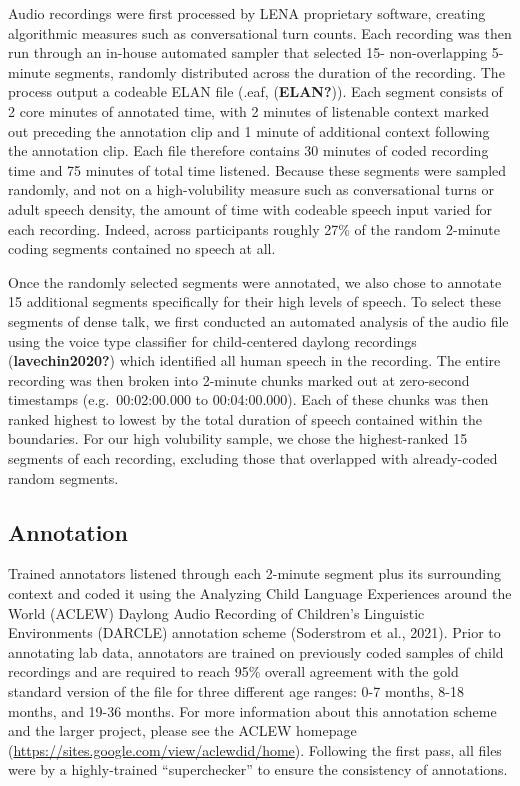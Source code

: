 \documentclass[
  man,floatsintext]{apa6}
\begin{document}
Audio recordings were first processed by LENA proprietary software, creating algorithmic measures such as conversational turn counts. Each recording was then run through an in-house automated sampler that selected 15- non-overlapping 5-minute segments, randomly distributed across the duration of the recording. The process output a codeable ELAN file (.eaf, (\textbf{ELAN?})). Each segment consists of 2 core minutes of annotated time, with 2 minutes of listenable context marked out preceding the annotation clip and 1 minute of additional context following the annotation clip. Each file therefore contains 30 minutes of coded recording time and 75 minutes of total time listened. Because these segments were sampled randomly, and not on a high-volubility measure such as conversational turns or adult speech density, the amount of time with codeable speech input varied for each recording. Indeed, across participants roughly 27\% of the random 2-minute coding segments contained no speech at all.

Once the randomly selected segments were annotated, we also chose to annotate 15 additional segments specifically for their high levels of speech. To select these segments of dense talk, we first conducted an automated analysis of the audio file using the voice type classifier for child-centered daylong recordings (\textbf{lavechin2020?}) which identified all human speech in the recording. The entire recording was then broken into 2-minute chunks marked out at zero-second timestamps (e.g.~00:02:00.000 to 00:04:00.000). Each of these chunks was then ranked highest to lowest by the total duration of speech contained within the boundaries. For our high volubility sample, we chose the highest-ranked 15 segments of each recording, excluding those that overlapped with already-coded random segments.

\hypertarget{annotation}{%
\subsection{Annotation}\label{annotation}}

Trained annotators listened through each 2-minute segment plus its surrounding context and coded it using the Analyzing Child Language Experiences around the World (ACLEW) Daylong Audio Recording of Children's Linguistic Environments (DARCLE) annotation scheme (Soderstrom et al., 2021). Prior to annotating lab data, annotators are trained on previously coded samples of child recordings and are required to reach 95\% overall agreement with the gold standard version of the file for three different age ranges: 0-7 months, 8-18 months, and 19-36 months. For more information about this annotation scheme and the larger project, please see the ACLEW homepage (\url{https://sites.google.com/view/aclewdid/home}). Following the first pass, all files were by a highly-trained ``superchecker'' to ensure the consistency of annotations.
\end{document}
